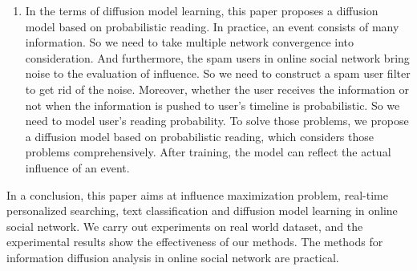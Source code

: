 \begin{eabstract}
\begin{enumerate}
	\item In the terms of diffusion model learning, this paper proposes a diffusion model based on probabilistic reading. In practice, an event consists of many information. So we need to take multiple network convergence into consideration. And furthermore, the spam users in online social network bring noise to the evaluation of influence. So we need to construct a spam user filter to get rid of the noise. Moreover, whether the user receives the information or not when the information is pushed to user's timeline is probabilistic. So we need to model user's reading probability. To solve those problems, we propose a diffusion model based on probabilistic reading, which considers those problems comprehensively. After training, the model can reflect the actual influence of an event.
\end{enumerate}

In a conclusion, this paper aims at influence maximization problem, real-time personalized searching, text classification and diffusion model learning in online social network. We carry out experiments on real world dataset, and the experimental results show the effectiveness of our methods. The methods for information diffusion analysis in online social network are practical.
\end{eabstract}

